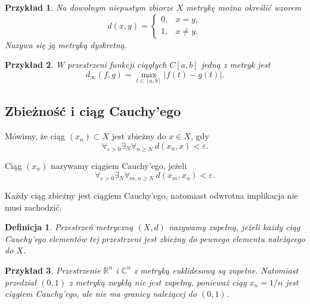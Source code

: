 \documentclass{article}
\newtheorem{definicja}{Definicja}
\newtheorem{przyklad}{Przykład}
\begin{document}
\begin{przyklad}
Na dowolnym niepustym zbiorze $X$ metrykę można określić wzorem
\[
d(x,y)=
\begin{cases}
0,&x=y,\\
1,&x\neq y.
\end{cases}
\]
Nazywa się ją metryką dyskretną.
\end{przyklad}

\begin{przyklad}
W przestrzeni funkcji ciągłych $C[a,b]$ jedną z metryk jest
\[
d_\infty(f,g)=\max_{t\in[a,b]}|f(t)-g(t)|.
\]
\end{przyklad}

\subsection{Zbieżność i ciąg Cauchy'ego}
Mówimy, że ciąg $(x_n)\subset X$ jest zbieżny do $x\in X$, gdy
\[
\forall_{\varepsilon>0}\exists_{N}\forall_{n\geq N}\ d(x_n,x)<\varepsilon.
\]

Ciąg $(x_n)$ nazywamy ciągiem Cauchy'ego, jeżeli
\[
\forall_{\varepsilon>0}\exists_{N}\forall_{m,n\geq N}\ d(x_m,x_n)<\varepsilon.
\]

Każdy ciąg zbieżny jest ciągiem Cauchy'ego, natomiast odwrotna implikacja nie musi zachodzić.

\begin{definicja}
Przestrzeń metryczną $(X,d)$ nazywamy zupełną, jeżeli każdy ciąg Cauchy'ego elementów tej przestrzeni jest zbieżny do pewnego elementu należącego do $X$.
\end{definicja}

\begin{przyklad}
Przestrzenie $\mathbb R^n$ i $\mathbb C^n$ z metryką euklidesową są zupełne.
Natomiast przedział $(0,1)$ z metryką zwykłą nie jest zupełny, ponieważ ciąg $x_n=1/n$ jest ciągiem Cauchy'ego, ale nie ma granicy należącej do $(0,1)$.
\end{przyklad}
\end{document}
